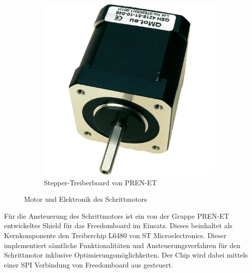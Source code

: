 \begin{figure}[h!]
\begin{subfigure}[b]{0.45\textwidth}
		\includegraphics[width=1\textwidth]{../../fig/et/QSH4218-51-10-049.jpg}
		\caption{Stepper-Treiberboard von PREN-ET}
	\end{subfigure}
	\caption{Motor und Elektronik des Schrittmotors}
\end{figure}

Für die Ansteuerung des Schrittmotors ist ein von der Gruppe PREN-ET
entwickeltes Shield für das Freedomboard im Einsatz. Dieses beinhaltet
als Kernkomponente den Treiberchip L6480 von ST Microelectronics. Dieser
implementiert sämtliche Funktionalitäten und Ansteuerungsverfahren für den
Schrittmotor inklusive Optimierungsmöglichkeiten. Der Chip wird dabei
mittels einer SPI Verbindung von Freedomboard aus gesteuert.
